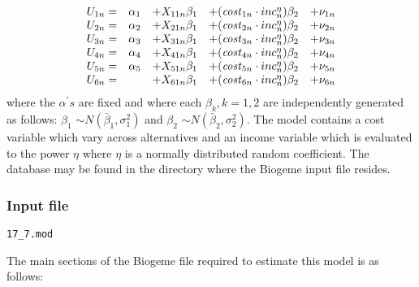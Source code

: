 \documentclass[12pt]{memoir}
\begin{document}
\begin{equation}%
\begin{array}
[c]{ccccc}%
U_{1n}= & \alpha_{1} & +X_{11n}\beta_{1} & +(\text{\textit{cost}}_{1n}\cdot
inc_{n}^{\eta})\beta_{2} & +\nu_{1n}\\
U_{2n}= & \alpha_{2} & +X_{21n}\beta_{1} & +(\text{\textit{cost}}_{2n}\cdot
inc_{n}^{\eta})\beta_{2} & +\nu_{2n}\\
U_{3n}= & \alpha_{3} & +X_{31n}\beta_{1} & +(\text{\textit{cost}}_{3n}\cdot
inc_{n}^{\eta})\beta_{2} & +\nu_{3n}\\
U_{4n}= & \alpha_{4} & +X_{41n}\beta_{1} & +(\text{\textit{cost}}_{4n}\cdot
inc_{n}^{\eta})\beta_{2} & +\nu_{4n}\\
U_{5n}= & \alpha_{5} & +X_{51n}\beta_{1} & +(\text{\textit{cost}}_{5n}\cdot
inc_{n}^{\eta})\beta_{2} & +\nu_{5n}\\
U_{6n}= &  & +X_{61n}\beta_{1} & +(\text{\textit{cost}}_{6n}\cdot
inc_{n}^{\eta})\beta_{2} & +\nu_{6n}%
\end{array}
\end{equation}
where the $\alpha^{\prime}s$ are fixed and where each $\beta_{k},k=1,2$ are
independently generated as follows: $\beta_{1}$ $\sim N(\bar{\beta}_{1}%
,\sigma_{1}^{2})$ and $\beta_{2}$ $\sim N(\bar{\beta}_{2},\sigma_{2}^{2}).$
The model contains a cost variable which vary across alternatives and an
income variable which is evaluated to the power $\eta$ where $\eta$ is a
normally distributed random coefficient. The database may be found in the
directory where the Biogeme input file resides. \ 

\subsubsection{Input file}

\begin{flushright}
  \verb+17_7.mod+

\end{flushright}
The main sections of the Biogeme file required to estimate this model is as follows:
\end{document}
